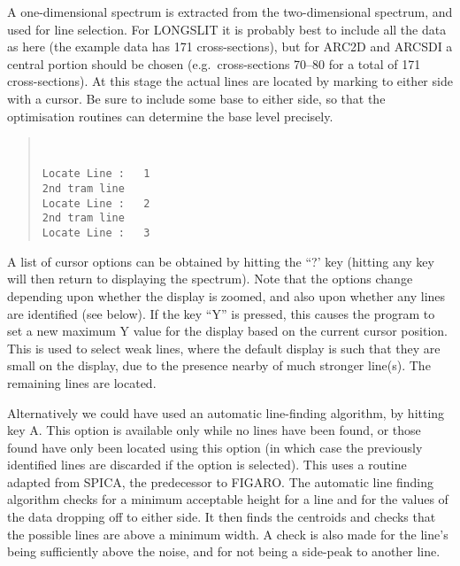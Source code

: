 A one-dimensional spectrum is extracted from the two-dimensional
spectrum, and used for line selection.
For LONGSLIT it is probably best to include all the data as here (the
example data has 171 cross-sections), but for ARC2D and ARCSDI a central
portion should be chosen (e.g.\ cross-sections 70--80 for a total of 171
cross-sections).
At this stage the actual lines are located by marking to either side
with a cursor.
Be sure to include some base to either side, so that the optimisation
routines can determine the base level precisely.
\begin{quote}\begin{verbatim}
 

Locate Line :   1
2nd tram line
Locate Line :   2
2nd tram line
Locate Line :   3
\end{verbatim}\end{quote}
A list of cursor options can be obtained by hitting the ``?' key (hitting
any key will then return to displaying the spectrum).
Note that the options change depending upon whether the display is
zoomed, and also upon whether any lines are identified (see below).
If the key ``Y'' is pressed, this causes the program to set a new
maximum Y value for the display based on the current cursor position.
This is used to select weak lines, where the default display is such
that they are small on the display, due to the presence nearby of much
stronger line(s).
The remaining lines are located.

Alternatively we could have used an automatic line-finding algorithm, by
hitting key A. This option is available only while no lines have been found,
or those found have only been located using this option (in which case the
previously identified lines are discarded if the option is selected).
This uses a routine adapted from SPICA, the predecessor to FIGARO.
The automatic line finding algorithm checks for a
minimum acceptable height for a line and for the values of the data
dropping off to either side. It then finds the centroids and checks
that the possible lines are above a minimum width. A check is also made
for the line's being sufficiently above the noise, and for not being a
side-peak to another line.

